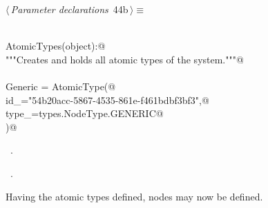 \documentclass[
    a4paper,      %
    10pt,         %
    openright,    %
    notitlepage,  %
    parskip=half, %
]{scrreprt}       %
\theoremstyle{definition}                    %
\begin{document}
\begin{flushleft} \small
\begin{minipage}{\linewidth}\label{scrap56}\raggedright\small
{} $\langle\,${\itshape Parameter declarations}\nobreak\ {\footnotesize {44b}}$\,\rangle\equiv$
\vspace{-1exm}
\begin{list}{}{} \item
\mbox{}\lstinline@@\\
\mbox{}\lstinline@class AtomicTypes(object):@\\
\mbox{}\lstinline@    """Creates and holds all atomic types of the system."""@\\
\mbox{}\lstinline@@\\
\mbox{}\lstinline@    Generic = AtomicType(@\\
\mbox{}\lstinline@        id_="54b20acc-5867-4535-861e-f461bdbf3bf3",@\\
\mbox{}\lstinline@        type_=types.NodeType.GENERIC@\\
\mbox{}\lstinline@    )@\\
\mbox{}\lstinline@@{\NWsep}
\end{list}
\vspace{-1.5ex}
\footnotesize
\begin{list}{}{\setlength{\itemsep}{-\parsep}\setlength{\itemindent}{-\leftmargin}}
\item \NWtxtMacroDefBy\ .
\item \NWtxtMacroRefIn\ .

\item{}
\end{list}
\end{minipage}\vspace{4ex}
\end{flushleft}
Having the atomic types defined, nodes may now be defined.
\end{document}

